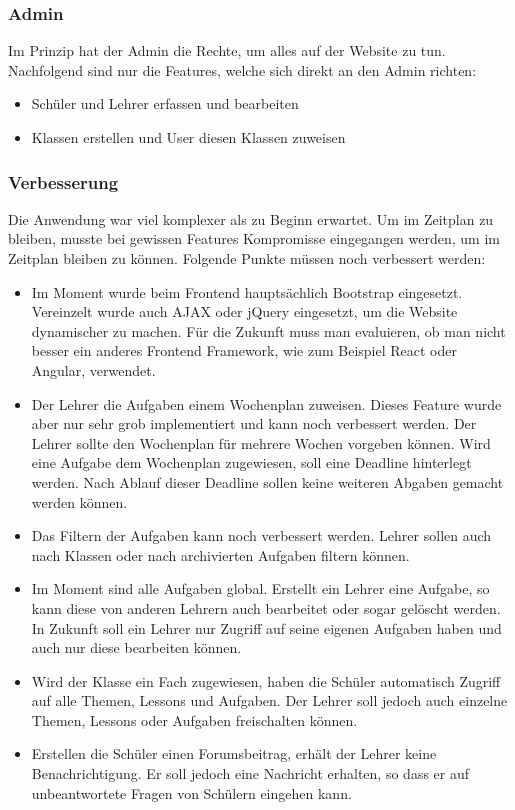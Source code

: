 \subsubsection*{Admin}
Im Prinzip hat der Admin die Rechte, um alles auf der Website zu tun. Nachfolgend sind nur die Features, welche sich direkt an den Admin richten:

\begin{itemize}
	\item Schüler und Lehrer erfassen und bearbeiten
	\item Klassen erstellen und User diesen Klassen zuweisen
\end{itemize}


\subsubsection{Verbesserung}
\label{verbesserung}
Die Anwendung war viel komplexer als zu Beginn erwartet. Um im Zeitplan zu bleiben, musste bei gewissen Features  Kompromisse eingegangen werden, um im Zeitplan bleiben zu können. Folgende Punkte müssen noch verbessert werden:

\begin{itemize}
	\item Im Moment wurde beim Frontend hauptsächlich Bootstrap eingesetzt. Vereinzelt wurde auch AJAX oder jQuery eingesetzt, um die Website dynamischer zu machen. Für die Zukunft muss man evaluieren, ob man nicht besser ein anderes Frontend Framework, wie zum Beispiel React oder Angular, verwendet.
	\item Der Lehrer die Aufgaben einem Wochenplan zuweisen. Dieses Feature wurde aber nur sehr grob implementiert und kann noch verbessert werden. Der Lehrer sollte den Wochenplan für mehrere Wochen vorgeben können. Wird eine Aufgabe dem Wochenplan zugewiesen, soll eine Deadline hinterlegt werden. Nach Ablauf dieser Deadline sollen keine weiteren Abgaben gemacht werden können.
	\item Das Filtern der Aufgaben kann noch verbessert werden. Lehrer sollen auch nach Klassen oder nach archivierten Aufgaben filtern können.
	\item Im Moment sind alle Aufgaben global. Erstellt ein Lehrer eine Aufgabe, so kann diese von anderen Lehrern auch bearbeitet oder sogar gelöscht werden. In Zukunft soll ein Lehrer nur Zugriff auf seine eigenen Aufgaben haben und auch nur diese bearbeiten können.
	\item Wird der Klasse ein Fach zugewiesen, haben die Schüler automatisch Zugriff auf alle Themen, Lessons und Aufgaben. Der Lehrer soll jedoch auch einzelne Themen, Lessons oder Aufgaben freischalten können.
	\item Erstellen die Schüler einen Forumsbeitrag, erhält der Lehrer keine Benachrichtigung. Er soll jedoch eine Nachricht erhalten, so dass er auf unbeantwortete Fragen von Schülern eingehen kann.
\end{itemize}


